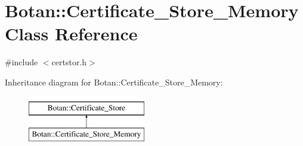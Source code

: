\hypertarget{classBotan_1_1Certificate__Store__Memory}{\section{Botan\-:\-:Certificate\-\_\-\-Store\-\_\-\-Memory Class Reference}
\label{classBotan_1_1Certificate__Store__Memory}
}


{\ttfamily \#include $<$certstor.\-h$>$}

Inheritance diagram for Botan\-:\-:Certificate\-\_\-\-Store\-\_\-\-Memory\-:\begin{figure}[H]
\begin{center}
\leavevmode
\includegraphics[height=2.000000cm]{classBotan_1_1Certificate__Store__Memory}
\end{center}
\end{figure}
